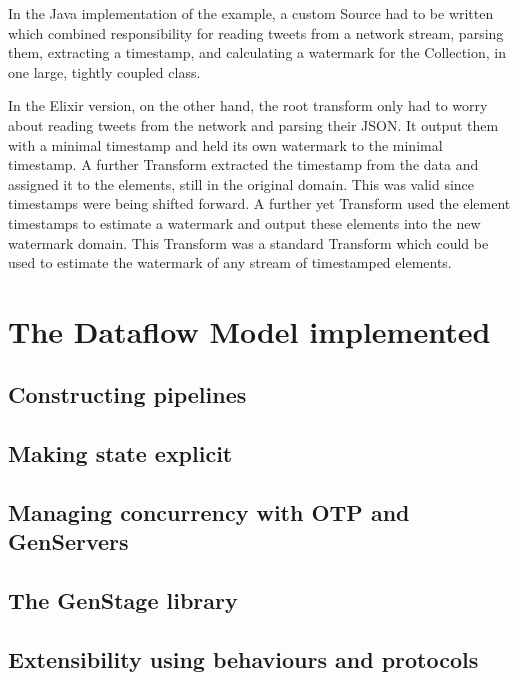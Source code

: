 In the Java implementation of the example, a custom Source had to be written which combined responsibility for reading tweets from a network stream, parsing them, extracting a timestamp, and calculating a watermark for the Collection, in one large, tightly coupled class.

In the Elixir version, on the other hand, the root transform only had to worry about reading tweets from the network and parsing their JSON.
It output them with a minimal timestamp and held its own watermark to the minimal timestamp.
A further Transform extracted the timestamp from the data and assigned it to the elements, still in the original domain.
This was valid since timestamps were being shifted forward.
A further yet Transform used the element timestamps to estimate a watermark and output these elements into the new watermark domain.
This Transform was a standard Transform which could be used to estimate the watermark of any stream of timestamped elements.



\section{The Dataflow Model implemented}\label{sec:impl:approach}

\subsection{Constructing pipelines}

\subsection{Making state explicit}


\subsection{Managing concurrency with OTP and GenServers}


\subsection{The GenStage library}


\subsection{Extensibility using behaviours and protocols}
